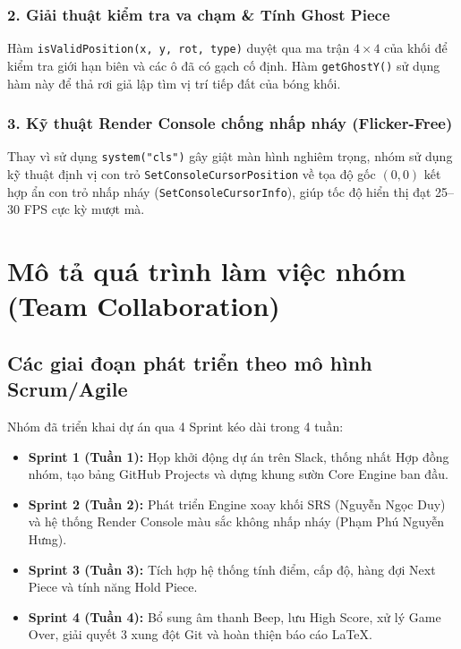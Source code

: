 \documentclass[12pt,a4paper]{article}
\begin{document}
\subsubsection{2. Giải thuật kiểm tra va chạm \& Tính Ghost Piece}
Hàm \texttt{isValidPosition(x, y, rot, type)} duyệt qua ma trận $4 \times 4$ của khối để kiểm tra giới hạn biên và các ô đã có gạch cố định. Hàm \texttt{getGhostY()} sử dụng hàm này để thả rơi giả lập tìm vị trí tiếp đất của bóng khối.

\subsubsection{3. Kỹ thuật Render Console chống nhấp nháy (Flicker-Free)}
Thay vì sử dụng \texttt{system("cls")} gây giật màn hình nghiêm trọng, nhóm sử dụng kỹ thuật định vị con trỏ \texttt{SetConsoleCursorPosition} về tọa độ gốc $(0,0)$ kết hợp ẩn con trỏ nhấp nháy (\texttt{SetConsoleCursorInfo}), giúp tốc độ hiển thị đạt 25--30 FPS cực kỳ mượt mà.

\newpage

\section{Mô tả quá trình làm việc nhóm (Team Collaboration)}

\subsection{Các giai đoạn phát triển theo mô hình Scrum/Agile}
Nhóm đã triển khai dự án qua 4 Sprint kéo dài trong 4 tuần:
\begin{itemize}
    \item \textbf{Sprint 1 (Tuần 1):} Họp khởi động dự án trên Slack, thống nhất Hợp đồng nhóm, tạo bảng GitHub Projects và dựng khung sườn Core Engine ban đầu.
    \item \textbf{Sprint 2 (Tuần 2):} Phát triển Engine xoay khối SRS (Nguyễn Ngọc Duy) và hệ thống Render Console màu sắc không nhấp nháy (Phạm Phú Nguyễn Hưng).
    \item \textbf{Sprint 3 (Tuần 3):} Tích hợp hệ thống tính điểm, cấp độ, hàng đợi Next Piece và tính năng Hold Piece.
    \item \textbf{Sprint 4 (Tuần 4):} Bổ sung âm thanh Beep, lưu High Score, xử lý Game Over, giải quyết 3 xung đột Git và hoàn thiện báo cáo LaTeX.
\end{itemize}
\end{document}
